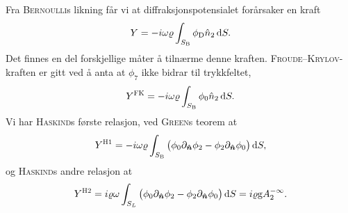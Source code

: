 Fra \textsc{Bernoulli}s likning får vi at diffraksjonspotensialet forårsaker en kraft
\[
Y = -i\omega\varrho\int_{S_{\mathrm{B}}} \phi_{\mathrm{D}}\hat{n}_2 \,\mathrm{d} S.
\]
Det finnes en del forskjellige måter å tilnærme denne kraften.
\textsc{Froude}--\textsc{Krylov}-kraften er gitt ved å anta at $\phi_7$ ikke bidrar til trykkfeltet,
\[
Y^{\textsc{FK}} = -i\omega\varrho\int_{S_{\mathrm{B}}} \phi_0 \hat{n}_2 \,\mathrm{d} S.
\]
Vi har \textsc{Haskind}s første relasjon, ved \textsc{Green}s teorem at
\[
Y^{\textsc{H1}} = -i\omega\varrho\int_{S_{\mathrm{B}}} \big( \phi_0\partial_{\bm{\hat{n}}}\phi_2 - \phi_2 \partial_{\bm{\hat{n}}}\phi_0 \big) \,\mathrm{d} S,
\]
og \textsc{Haskind}s andre relasjon at
\[
Y^{\textsc{H2}} = i\varrho\omega \int_{S_{L}}\big( \phi_0 \partial_{\bm{\hat{n}}}\phi_2 - \phi_2 \partial_{\bm{\hat{n}}}\phi_0 \big) \,\mathrm{d} S = i\varrho\mathrm{g} A_{2}^{-\infty}.
\]
